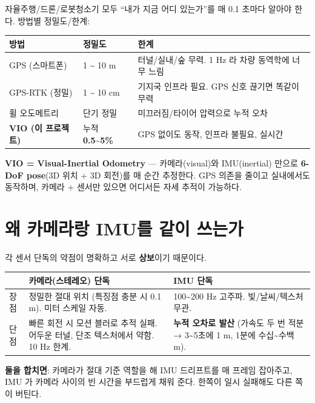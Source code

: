 \documentclass[11pt,a4paper,oneside]{report}
\begin{document}
자율주행/드론/로봇청소기 모두 ``내가 지금 어디 있는가''를 매 0.1 초마다 알아야 한다. 방법별 정밀도/한계:

\begin{center}\small
\begin{tabular}{lll}
\toprule
방법 & 정밀도 & 한계 \\
\midrule
GPS (스마트폰) & 1 \textasciitilde{} 10 m & 터널/실내/숲 무력. 1 Hz 라 차량 동역학에 너무 느림 \\
GPS-RTK (정밀) & 1 \textasciitilde{} 10 cm & 기지국 인프라 필요. GPS 신호 끊기면 똑같이 무력 \\
휠 오도메트리 & 단기 정밀 & 미끄러짐/타이어 압력으로 누적 오차 \\
\textbf{VIO (이 프로젝트)} & 누적 \textbf{0.5\textasciitilde{}5\%} & GPS 없이도 동작, 인프라 불필요, 실시간 \\
\bottomrule
\end{tabular}
\end{center}

\textbf{VIO = Visual-Inertial Odometry} — 카메라(visual)와 IMU(inertial) 만으로 \textbf{6-DoF pose}(3D 위치 + 3D 회전)를 매 순간 추정한다. GPS 의존을 줄이고 실내에서도 동작하며, 카메라 + 센서만 있으면 어디서든 자세 추적이 가능하다.

\section{왜 카메라랑 IMU를 같이 쓰는가}

각 센서 단독의 약점이 명확하고 서로 \textbf{상보}이기 때문이다.

\begin{center}\small
\begin{tabular}{p{}p{}p{}}
\toprule
& \textbf{카메라(스테레오) 단독} & \textbf{IMU 단독} \\
\midrule
장점 &
정밀한 절대 위치 (특징점 충분 시 0.1 m). 미터 스케일 자동. &
100\textasciitilde{}200 Hz 고주파. 빛/날씨/텍스처 무관. \\
\midrule
단점 &
빠른 회전 시 모션 블러로 추적 실패. 어두운 터널, 단조 텍스처에서 약함. 10 Hz 한계. &
\textbf{누적 오차로 발산} (가속도 두 번 적분 → 3\textasciitilde{}5초에 1 m, 1분에 수십\textasciitilde{}수백 m). \\
\bottomrule
\end{tabular}
\end{center}

\textbf{둘을 합치면}: 카메라가 절대 기준 역할을 해 IMU 드리프트를 매 프레임 잡아주고, IMU 가 카메라 사이의 빈 시간을 부드럽게 채워 준다. 한쪽이 일시 실패해도 다른 쪽이 버틴다.
\end{document}
